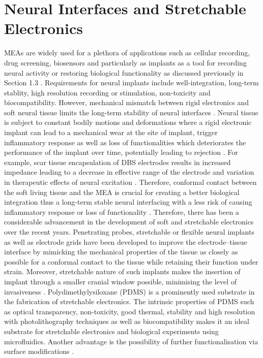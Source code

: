 
\section{Neural Interfaces and Stretchable Electronics}
\label{ch:intro:sec:modeling}
 MEAs are widely used for a plethora of applications such as cellular recording, drug screening, biosensors and particularly as implants as a tool for recording neural activity or restoring biological functionality as discussed previously in Section 1.3 \cite{adly2018printed}. Requirements for neural implants include well-integration, long-term stablity, high resolution recording or stimulation, non-toxicity and biocompatibility. However, mechanical mismatch between rigid electronics and soft neural tissue limits the long-term stability of neural interfaces \cite{tybrandt2018high}. Neural tissue is subject to constant bodily motions and deformations where a rigid electronic implant can lead to a mechanical wear at the site of implant, trigger inflammatory response as well as loss of functionalities which deteriorates the performance of the implant over time, potentially leading to rejection \cite{adly2018printed} \cite{tybrandt2018high}. For example, scar tissue encapsulation of DBS electrodes results in increased impedance leading to a decrease in effective range of the electrode and variation in therapeutic effects of neural excitation \cite{du2017ultrasoft}. Therefore, conformal contact between the soft living tissue and the MEA is crucial for creating a better biological integration thus a long-term stable neural interfacing with a less risk of causing inflammatory response or loss of functionality \cite{adly2018printed} \cite{tybrandt2018high}. Therefore, there has been a considerable advancement in the development of soft and stretchable electronics over the recent years. Penetrating probes, stretchable or flexible neural implants as well as electrode grids have been developed to improve the electrode–tissue interface by mimicking the mechanical properties of the tissue as closely as possible for a conformal contact to the tissue while retaining their function under strain. Moreover, stretchable nature of such implants makes the insertion of implant through a smaller cranial window possible, minimising the level of invasiveness \cite{tybrandt2018high}. Polydimethylysiloxane (PDMS) is a prominently used substrate in the fabrication of stretchable electronics. \cite{qi2021stretchable} The intrinsic properties of PDMS such as optical transparency, non-toxicity, good thermal, stability and high resolution with photolithography techniques as well as biocompatibility makes it an ideal substrate for stretchable electronics and biological experiments using microfluidics. Another advantage is the possibility of further functionalisation via surface modifications \cite{qi2021stretchable}. 


